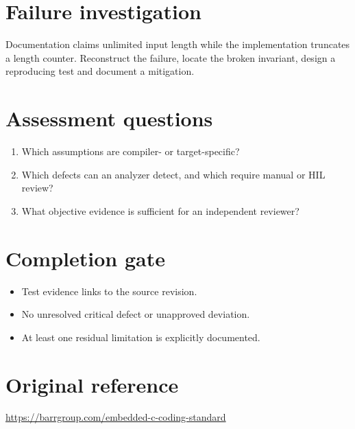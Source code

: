\documentclass[10pt,letterpaper]{article}
\begin{document}
\section{Failure investigation}
Documentation claims unlimited input length while the implementation truncates a length counter. Reconstruct the failure, locate the broken invariant, design a reproducing test and document a mitigation.
\section{Assessment questions}
\begin{enumerate}
\item Which assumptions are compiler- or target-specific?
\item Which defects can an analyzer detect, and which require manual or HIL review?
\item What objective evidence is sufficient for an independent reviewer?
\end{enumerate}

\section{Completion gate}
\begin{itemize}
\item Test evidence links to the source revision.
\item No unresolved critical defect or unapproved deviation.
\item At least one residual limitation is explicitly documented.
\end{itemize}

\section{Original reference}
\url{https://barrgroup.com/embedded-c-coding-standard}
\end{document}
